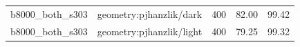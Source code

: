 \begin{longtable}{l>{\raggedright\arraybackslash}p{.42\linewidth}rrr}
b8000\_\allowbreak{}both\_\allowbreak{}s303 & %
geometry:pjhanzlik/dark & %
400 & %
82.00 & %
99.42 \\ %

b8000\_\allowbreak{}both\_\allowbreak{}s303 & %
geometry:pjhanzlik/light & %
400 & %
79.25 & %
99.32 \\ %


\end{longtable}
